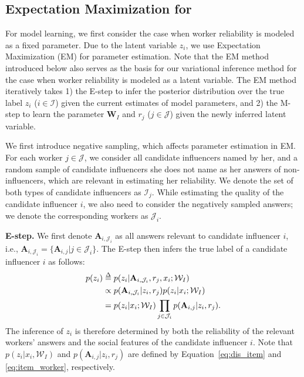 \subsection{Expectation Maximization for \sys} 
\label{sec:em}
For model learning, we first consider the case when worker reliability is modeled as a fixed parameter. Due to the latent variable $z_i$, we use Expectation Maximization (EM) \cite{dempster1977maximum} for parameter estimation. Note that the EM method introduced below also serves as the basis for our variational inference method for the case when worker reliability is modeled as a latent variable. The EM method iteratively takes 1) the E-step to infer the posterior distribution over the true label $z_i$ ($i\in \mathcal{I}$) given the current estimates of model parameters, and 2) the M-step to learn the parameter $\mathbf{W}_I$ and $r_j$ ($j\in \mathcal{J}$) given the newly inferred latent variable.

We first introduce negative sampling, which affects parameter estimation in EM. For each worker $j\in \mathcal{J}$, we consider all candidate influencers named by her, and a random sample of candidate influencers she does not name as her answers of non-influencers, which are relevant in estimating her reliability. We denote the set of both types of candidate influencers as $\mathcal{I}_j$. While estimating the quality of the candidate influencer $i$, we also need to consider the negatively sampled answers; we denote the corresponding workers as $\mathcal{J}_i$.

\smallskip
\noindent\textbf{E-step.} We first denote $\mathbf{A}_{i,\mathcal{J}_i}$ as all answers relevant to candidate influencer $i$, i.e., $\mathbf{A}_{i,\mathcal{J}_i} = \{\mathbf{A}_{i,j}|j \in \mathcal{J}_i\}$. The E-step then infers the true label of a candidate influencer $i$ as follows:
%
\begin{align}
    p(z_i) & \delequal p(z_i|\mathbf{A}_{i,\mathcal{J}_i},r_{j},x_i;\mathcal{W}_I) \nonumber\\
        &\propto p(\mathbf{A}_{i,\mathcal{J}_i}|z_i,r_j) p(z_i|x_i;\mathcal{W}_I) \label{eq:dist_cond}\\
        &=p(z_i|x_i;\mathcal{W}_I) \prod_{j \in \mathcal{J}_i} p(\mathbf{A}_{i,j}|z_i,r_{j}). \nonumber    
\end{align}
%
The inference of $z_i$ is therefore determined by both the reliability of the relevant workers' answers and the social features of the candidate influencer $i$. Note that $p(z_i|x_i,\mathcal{W}_I)$ and $p(\mathbf{A}_{i,j}|z_i,r_{j})$ are defined by Equation~\ref{eq:dis_item} and \ref{eq:item_worker}, respectively.

